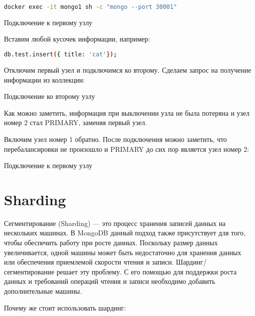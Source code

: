 \begin{lstlisting}[language=bash]
docker exec -it mongo1 sh -c "mongo --port 30001"
\end{lstlisting}

\begin{image}
	\caption{Подключение к первому узлу}
	\label{fig:connect:mongo1}
\end{image}

Вставим любой кусочек информации, например:

\begin{lstlisting}[language=bash]
db.test.insert({ title: 'cat'});
\end{lstlisting}

Отключим первый узел и подключимся ко второму.
Сделаем запрос на получение информации из коллекции:

\begin{image}
	\caption{Подключение ко второму узлу}
	\label{fig:connect:mongo2}
\end{image}

Как можно заметить, информация при выключении узла не была потеряна
и узел номер 2 стал PRIMARY, заменяя первый узел.

Включим узел номер 1 обратно.
После подключения можно заметить, что перебалансировки не
произошло и PRIMARY до сих пор является узел номер 2:

\begin{image}
	\caption{Подключение к первому узлу}
	\label{fig:connect:mongo1:2}
\end{image}

\section{Sharding}

Сегментирование (Sharding) --- это процесс хранения записей данных на
нескольких машинах. В MongoDB данный подход также присутствует для того,
чтобы обеспечить работу при росте данных. Поскольку размер данных
увеличивается, одной машины может быть недостаточно для хранения данных
или обеспечения приемлемой скорости чтения и
записи. Шардинг/сегментирование решает эту проблему. С его помощью для
поддержки роста данных и требований операций чтения и записи необходимо
добавить дополнительные машины.\par
Почему же стоит использовать шардинг:

